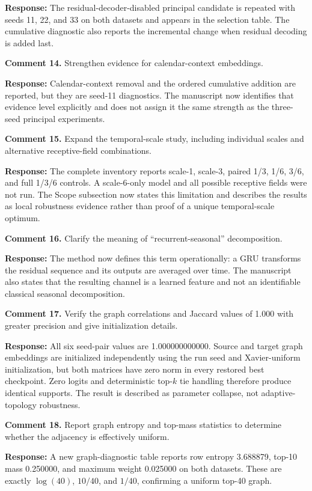 \documentclass[11pt]{article}
\newcommand{\response}[1]{\par\noindent\textcolor{responseblue}{\textbf{Response:} #1}\par}
\begin{document}
\response{The residual-decoder-disabled principal candidate is repeated with seeds 11, 22, and 33 on both datasets and appears in the selection table. The cumulative diagnostic also reports the incremental change when residual decoding is added last.}

\textbf{Comment 14.} Strengthen evidence for calendar-context embeddings.

\response{Calendar-context removal and the ordered cumulative addition are reported, but they are seed-11 diagnostics. The manuscript now identifies that evidence level explicitly and does not assign it the same strength as the three-seed principal experiments.}

\textbf{Comment 15.} Expand the temporal-scale study, including individual scales and alternative receptive-field combinations.

\response{The complete inventory reports scale-1, scale-3, paired 1/3, 1/6, 3/6, and full 1/3/6 controls. A scale-6-only model and all possible receptive fields were not run. The Scope subsection now states this limitation and describes the results as local robustness evidence rather than proof of a unique temporal-scale optimum.}

\textbf{Comment 16.} Clarify the meaning of ``recurrent-seasonal'' decomposition.

\response{The method now defines this term operationally: a GRU transforms the residual sequence and its outputs are averaged over time. The manuscript also states that the resulting channel is a learned feature and not an identifiable classical seasonal decomposition.}

\textbf{Comment 17.} Verify the graph correlations and Jaccard values of 1.000 with greater precision and give initialization details.

\response{All six seed-pair values are 1.000000000000. Source and target graph embeddings are initialized independently using the run seed and Xavier-uniform initialization, but both matrices have zero norm in every restored best checkpoint. Zero logits and deterministic top-$k$ tie handling therefore produce identical supports. The result is described as parameter collapse, not adaptive-topology robustness.}

\textbf{Comment 18.} Report graph entropy and top-mass statistics to determine whether the adjacency is effectively uniform.

\response{A new graph-diagnostic table reports row entropy 3.688879, top-10 mass 0.250000, and maximum weight 0.025000 on both datasets. These are exactly $\log(40)$, $10/40$, and $1/40$, confirming a uniform top-40 graph.}
\end{document}
